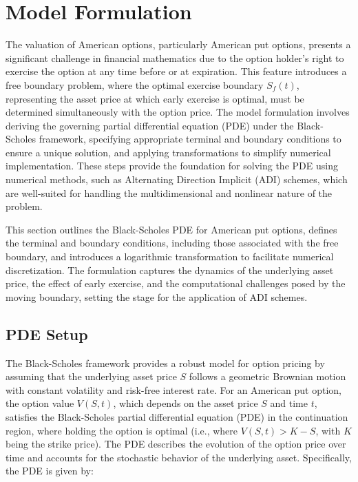 \documentclass[12pt]{article}
\begin{document}
\section{Model Formulation}
The valuation of American options, particularly American put options, presents a significant challenge in financial mathematics due to the option holder's right to exercise the option at any time before or at expiration. This feature introduces a free boundary problem, where the optimal exercise boundary \( S_f(t) \), representing the asset price at which early exercise is optimal, must be determined simultaneously with the option price. The model formulation involves deriving the governing partial differential equation (PDE) under the Black-Scholes framework, specifying appropriate terminal and boundary conditions to ensure a unique solution, and applying transformations to simplify numerical implementation. These steps provide the foundation for solving the PDE using numerical methods, such as Alternating Direction Implicit (ADI) schemes, which are well-suited for handling the multidimensional and nonlinear nature of the problem.

This section outlines the Black-Scholes PDE for American put options, defines the terminal and boundary conditions, including those associated with the free boundary, and introduces a logarithmic transformation to facilitate numerical discretization. The formulation captures the dynamics of the underlying asset price, the effect of early exercise, and the computational challenges posed by the moving boundary, setting the stage for the application of ADI schemes.

\subsection{PDE Setup}
The Black-Scholes framework provides a robust model for option pricing by assuming that the underlying asset price \( S \) follows a geometric Brownian motion with constant volatility and risk-free interest rate. For an American put option, the option value \( V(S, t) \), which depends on the asset price \( S \) and time \( t \), satisfies the Black-Scholes partial differential equation (PDE) in the continuation region, where holding the option is optimal (i.e., where \( V(S, t) > K - S \), with \( K \) being the strike price). The PDE describes the evolution of the option price over time and accounts for the stochastic behavior of the underlying asset. Specifically, the PDE is given by:
\end{document}
